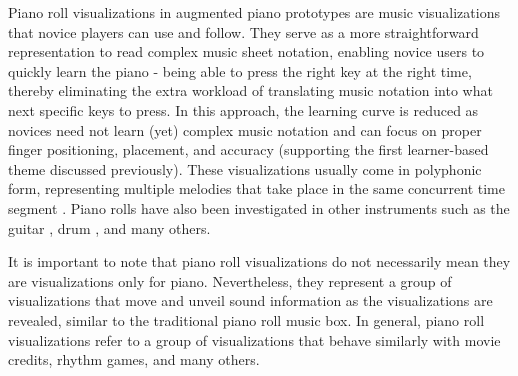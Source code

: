 \documentclass[sigconf, screen, review]{acmart}
\begin{document}
Piano roll visualizations in augmented piano prototypes are music visualizations that novice players can use and follow. They serve as a more straightforward representation to read complex music sheet notation, enabling novice users to quickly learn the piano \cite{walder2016modelling} - being able to press the right key at the right time, thereby eliminating the extra workload of translating music notation into what next specific keys to press. In this approach, the learning curve is reduced as novices need not learn (yet) complex music notation and can focus on proper finger positioning, placement, and accuracy (supporting the first learner-based theme discussed previously). These visualizations usually come in polyphonic form, representing multiple melodies that take place in the same concurrent time segment \cite{ciuha2010visualization}. Piano rolls have also been investigated in other instruments such as the guitar \cite{biamonte2010musical}, drum \cite{rossignol2015alternate}, and many others.

It is important to note that piano roll visualizations do not necessarily mean they are visualizations only for piano. Nevertheless, they represent a group of visualizations that move and unveil sound information as the visualizations are revealed, similar to the traditional piano roll music box. In general, piano roll visualizations refer to a group of visualizations that behave similarly with movie credits, rhythm games, and many others. 
\end{document}
